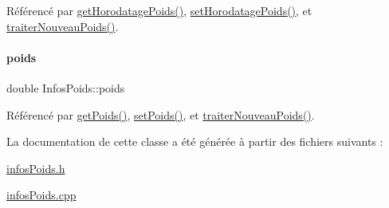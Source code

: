 Référencé par \hyperlink{class_infos_poids_a9bd9ffa1a5fcd75a8d75bd7330727620}{get\+Horodatage\+Poids()}, \hyperlink{class_infos_poids_add0957f341ade104a4521ead7562dff8}{set\+Horodatage\+Poids()}, et \hyperlink{class_infos_poids_aa5284d38d33adba31ba033b8af61cc96}{traiter\+Nouveau\+Poids()}.

\mbox{\label{class_infos_poids_ac5faebb99bd0f87f96b442f10349cbd8}} 
\paragraph{\texorpdfstring{poids}{poids}}
{\footnotesize\ttfamily double Infos\+Poids\+::poids\hspace{0.3cm}{\ttfamily [private]}}



Référencé par \hyperlink{class_infos_poids_a902fb0222d3b2fa396987daed57377d2}{get\+Poids()}, \hyperlink{class_infos_poids_a23bb9c5939d0ee5cab0ecf821cdc6779}{set\+Poids()}, et \hyperlink{class_infos_poids_aa5284d38d33adba31ba033b8af61cc96}{traiter\+Nouveau\+Poids()}.



La documentation de cette classe a été générée à partir des fichiers suivants \+:\begin{DoxyCompactItemize}
\item 
\hyperlink{infos_poids_8h}{infos\+Poids.\+h}\item 
\hyperlink{infos_poids_8cpp}{infos\+Poids.\+cpp}\end{DoxyCompactItemize}
